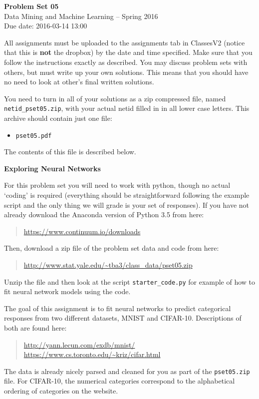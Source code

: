 \documentclass[12pt]{article}
\begin{document}
\begin{center}
{\bf Problem Set 05} \\
Data Mining and Machine Learning -- Spring 2016 \\
Due date: 2016-03-14 13:00
\end{center}

\medskip

All assignments must be uploaded to the assignments tab in ClassesV2
(notice that this is \textbf{not} the dropbox) by the date and time specified.
Make sure that you follow the instructions exactly as described.
You may discuss problem sets with others, but must write up your own
solutions. This means that you should have no need to look at other's
final written solutions.

You need to turn in all of your solutions as a zip compressed file, named
\texttt{netid\_pset05.zip}, with your actual netid filled in in all lower
case letters. This archive should contain just one file:
\begin{itemize}
\item \texttt{pset05.pdf}
\end{itemize}
The contents of this file is described below.

\medskip

\textbf{Exploring Neural Networks}

For this problem set you will need to work with python, though no actual
`coding' is required (everything should be straightforward following the
example script and the only thing we will grade is your set of responses).
If you have not already download the Anaconda version of Python 3.5 from
here:
\begin{quote}
\url{https://www.continuum.io/downloads}
\end{quote}
Then, download a zip file of the problem set data and code from here:
\begin{quote}
\url{http://www.stat.yale.edu/~tba3/class_data/pset05.zip}
\end{quote}
Unzip the file and then look at the script \texttt{starter\_code.py} for example
of how to fit neural network models using the code.

The goal of this assignment is to fit neural networks to predict categorical
responses from two different datasets, MNIST and CIFAR-10. Descriptions of
both are found here:
\begin{quote}
\url{http://yann.lecun.com/exdb/mnist/} \\
\url{https://www.cs.toronto.edu/~kriz/cifar.html}
\end{quote}
The data is already nicely parsed and cleaned for you as part of the \texttt{pset05.zip}
file. For CIFAR-10, the numerical categories correspond to the alphabetical ordering
of categories on the website.
\end{document}
